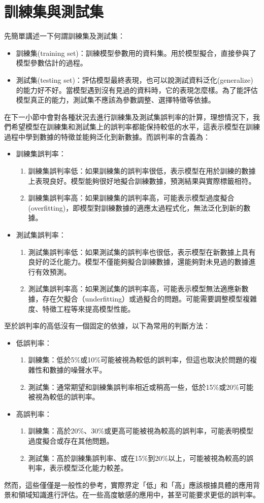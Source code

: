 \documentclass[12pt, a4paper]{article}
\begin{document}
\section{訓練集與測試集}
先簡單講述一下何謂訓練集及測試集：
\begin{itemize}
\item 訓練集(training set)：訓練模型參數用的資料集。用於模型擬合，直接參與了模型參數估計的過程。
\item 測試集(testing set)：評估模型最終表現，也可以說測試資料泛化(generalize)的能力好不好。當模型遇到沒有見過的資料時，它的表現怎麼樣。為了能評估模型真正的能力，測試集不應該為參數調整、選擇特徵等依據。
\end{itemize}
在下一小節中會對各種狀況去進行訓練集及測試集誤判率的計算，理想情況下，我們希望模型在訓練集和測試集上的誤判率都能保持較低的水平，這表示模型在訓練過程中學到數據的特徵並能夠泛化到新數據。而誤判率的含義為：
\begin{itemize}
\item 訓練集誤判率：
\begin{enumerate}
\item 訓練集誤判率低：如果訓練集的誤判率很低，表示模型在用於訓練的數據上表現良好。模型能夠很好地擬合訓練數據，預測結果與實際標籤相符。
\item 訓練集誤判率高：如果訓練集的誤判率高，可能表示模型過度擬合(overfitting)，即模型對訓練數據的適應太過程式化，無法泛化到新的數據。
\end{enumerate}
\item 測試集誤判率：
\begin{enumerate}
\item 測試集誤判率低：如果測試集的誤判率也很低，表示模型在新數據上具有良好的泛化能力。模型不僅能夠擬合訓練數據，還能夠對未見過的數據進行有效預測。
\item 測試集誤判率高：如果測試集的誤判率高，可能表示模型無法適應新數據，存在欠擬合（underfitting）或過擬合的問題。可能需要調整模型複雜度、特徵工程等來提高模型性能。
\end{enumerate}
\end{itemize}
至於誤判率的高低沒有一個固定的依據，以下為常用的判斷方法：
\begin{itemize}
\item 低誤判率：
\begin{enumerate}
\item 訓練集：低於5\%或10\%可能被視為較低的誤判率，但這也取決於問題的複雜性和數據的噪聲水平。
\item 測試集：通常期望和訓練集誤判率相近或稍高一些，低於15\%或20\%可能被視為較低的誤判率。
\end{enumerate}
\item 高誤判率：
\begin{enumerate}
\item 訓練集：高於20\%、30\%或更高可能被視為較高的誤判率，可能表明模型過度擬合或存在其他問題。
\item 測試集：高於訓練集誤判率、或在15\%到20\%以上，可能被視為較高的誤判率，表示模型泛化能力較差。
\end{enumerate}
\end{itemize}
然而，這些僅僅是一般性的參考，實際界定「低」和「高」應該根據具體的應用背景和領域知識進行評估。在一些高度敏感的應用中，甚至可能要求更低的誤判率。
\end{document}

